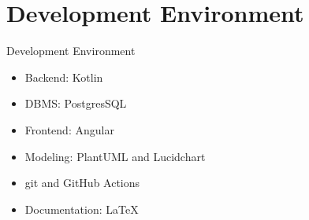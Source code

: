 \section{Development Environment}

\begin{frame}{Development Environment}
    \begin{itemize}
        \item<+-> Backend: Kotlin
        \item<+-> DBMS: PostgresSQL
        \item<+-> Frontend: Angular
        \item<+-> Modeling: PlantUML and Lucidchart
        \item<+-> git and GitHub Actions
        \item<+-> Documentation: \LaTeX\
    \end{itemize}
\end{frame}
